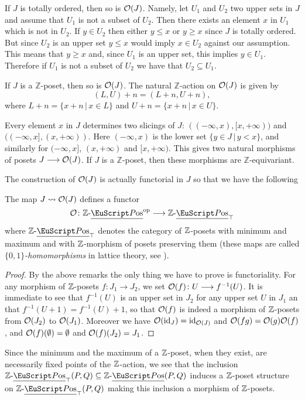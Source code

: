 \begin{remark}\label{rem.totOj}
If $J$ is totally ordered, then so is $\mathcal{O}(J)$. Namely, let $U_1$ and $U_2$ two upper sets in $J$ and assume that $U_1$ is not a subset of $U_2$. Then there exists an element $x$ in $U_1$ which is not in $U_2$. If $y\in U_2$ then either $y\leq x$ or $y\geq x$ since $J$ is totally ordered. But since $U_2$ is an upper set $y\leq x$ would imply $x\in U_2$ against our assumption. This means that $y\geq x$ and, since $U_1$ is an upper set, this implies $y\in U_1$. Therefore if $U_1$ is not a subset of $U_2$ we have that $U_2\subseteq U_1$.
\end{remark}
\begin{remark}
If $J$ is a $\mathbb{Z}$-poset, then so is $\mathcal{O}(J)$. The natural $\mathbb{Z}$-action on $\mathcal{O}(J)$ is given by
\[
(L,U)+n=(L+n,U+n),
\]
where $L+n=\{x+n\,|\, x\in L\}$ and $U+n=\{x+n\,|\, x\in U\}$.
\end{remark}
\begin{remark}
Every element $x$ in $J$ determines two slicings of $J$: $((-\infty,x),[x,+\infty))$ and $((-\infty,x],(x,+\infty))$. Here $(-\infty,x)$ is the lower set $\{y\in J\,|\, y<x\}$, and similarly for $(-\infty,x]$, $(x,+\infty)$ and $[x,+\infty)$. This gives two natural morphisms of posets $J\longrightarrow \mathcal{O}(J)$. If $J$ is a $\mathbb{Z}$-poset, then these morphisms are $\mathbb{Z}$-equivariant.
\end{remark}
The construction of $\mathcal{O}(J)$ is actually functorial in $J$ so that we have the following
\begin{lemma}\label{lemma.O-is-functor}
The map $J\rightsquigarrow \mathcal{O}(J)$ defines a functor
\[
\O\colon \ZPos^{\mathrm{op}} \to \ZPos_{\top}
\]
where $\ZPos_{\top}$ denotes the category of $\mathbb{Z}$-posets with minimum and maximum and with $\mathbb{Z}$-morphism of posets preserving them (these maps are called \emph{$\{0,1\}$-homomorphisms} in lattice theory, see \cite{Gratzer}).
\end{lemma}
\begin{proof}
By the above remarks the only thing we have to prove is functoriality. For any morphism of $\mathbb{Z}$-posets $f\colon J_1\to J_2$, we set $\mathcal{O}(f)\colon U\longrightarrow f^{-1}(U)$. It is immediate to see that $f^{-1}(U)$ is an upper set in $J_2$ for any upper set $U$ in $J_1$ an that $f^{-1}(U+1)=f^{-1}(U)+1$, so that $\mathcal{O}(f)$ is indeed a morphism of $\mathbb{Z}$-posets from $\mathcal{O}(J_2)$ to $\mathcal{O}(J_1)$. Moreover we have $\mathcal{O}(\mathrm{id}_J)=\mathrm{id}_{\mathcal{O}(J)}$ and $\mathcal{O}(fg)=\mathcal{O}(g)\mathcal{O}(f)$, and $\mathcal{O}(f)(\emptyset)=\emptyset$ and $\mathcal{O}(f)(J_2)=J_1$.
\end{proof}
\begin{remark}\label{rem.hom-is-Z-pos}
Since the minimum and the maximum of a $\mathbb{Z}$-poset, when they exist, are necessarily fixed points of the $\mathbb{Z}$-action, we see that the inclusion  $\ZPos_{\top}(P,Q)\subseteq \ZPos(P,Q)$ induces a $\mathbb{Z}$-poset structure on $\ZPos_{\top}(P,Q)$ making this inclusion a morphism of $\mathbb{Z}$-posets.
\end{remark}

